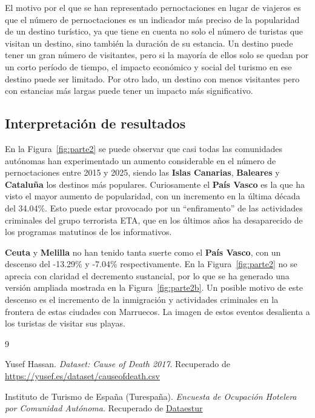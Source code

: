 \documentclass[12pt]{article}
\begin{document}
El motivo por el que se han representado pernoctaciones en lugar de viajeros es que el 
número de pernoctaciones es un indicador más preciso de la popularidad de un destino 
turístico, ya que tiene en cuenta no solo el número de turistas que visitan un destino, 
sino también la duración de su estancia. Un destino puede tener un gran número de 
visitantes, pero si la mayoría de ellos solo se quedan por un corto período de tiempo, 
el impacto económico y social del turismo en ese destino puede ser limitado. Por otro 
lado, un destino con menos visitantes pero con estancias más largas puede tener un 
impacto más significativo.

\subsection{Interpretación de resultados}

En la Figura~\ref{fig:parte2} se puede observar que casi todas las comunidades 
autónomas han experimentado un aumento considerable en el número de pernoctaciones 
entre 2015 y 2025, siendo las \textbf{Islas Canarias}, \textbf{Baleares} y \textbf{Cataluña} los destinos más 
populares. Curiosamente el \textbf{País Vasco} es la que ha visto el mayor aumento de popularidad, 
con un incremento en la última década del 34.04\%. Esto puede estar provocado por un 
``enfiramento'' de las actividades criminales del grupo terrorista ETA, que en los 
últimos años ha desaparecido de los programas matutinos de los informativos.

\textbf{Ceuta} y \textbf{Melilla} no han tenido tanta suerte como el \textbf{País Vasco}, con un descenso del 
-13.29\% y -7.04\% respectivamente. En la Figura~\ref{fig:parte2} no se aprecia con 
claridad el decremento sustancial, por lo que se ha generado una versión ampliada 
mostrada en la Figura~\ref{fig:parte2b}. Un posible motivo de este descenso es el 
incremento de la inmigración y actividades criminales en la frontera de estas ciudades 
con Marruecos. La imagen de estos eventos desalienta a los turistas de visitar sus 
playas.

\clearpage

\begin{thebibliography}{9}

Yusef Hassan.
\textit{Dataset: Cause of Death 2017}.
Recuperado de \url{https://yusef.es/dataset/causeofdeath.csv}

Instituto de Turismo de España (Turespaña).
\textit{Encuesta de Ocupación Hotelera por Comunidad Autónoma}.
Recuperado de \href{https://www.dataestur.es/apidata/}{Dataestur}

\end{thebibliography}
\end{document}
